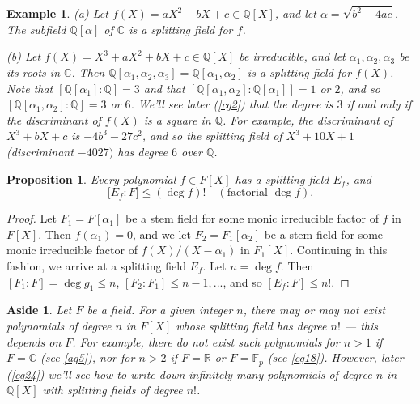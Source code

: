 \documentclass[a4paper,11pt,final,openany]{memoir}
\newtheorem{proposition}[X]{Proposition}
\newtheorem{example}[X]{Example}
\newtheorem{aside}[X]{Aside}
\theoremstyle{nonumberplain}
\newtheorem{proof}{Proof.}
\begin{document}
\begin{example}
\label{sf3}(a) Let $f(X)=aX^{2}+bX+c\in\mathbb{Q}{}[X]$, and let $\alpha
=\sqrt{b^{2}-4ac}$. The subfield $\mathbb{Q}[\alpha]$ of $\mathbb{C}$ is a
splitting field for $f$.

(b) Let $f(X)=X^{3}+aX^{2}+bX+c\in\mathbb{Q}[X]$ be irreducible, and let
$\alpha_{1},\alpha_{2},\alpha_{3}$ be its roots in $\mathbb{C}$. Then
$\mathbb{Q}[\alpha_{1},\alpha_{2},\alpha_{3}]=\mathbb{Q}[\alpha_{1},\alpha
_{2}]$ is a splitting field for $f(X)$. Note that $[\mathbb{Q}[\alpha
_{1}]\colon\mathbb{Q}]=3$ and that $[\mathbb{Q}[\alpha_{1},\alpha_{2}%
]\colon\mathbb{Q}[\alpha_{1}]]=1$ or $2$, and so $[\mathbb{Q}[\alpha
_{1},\alpha_{2}]\colon\mathbb{Q}]=3$ or $6$. We'll see later (\ref{cg2}) that
the degree is $3$ if and only if the discriminant of $f(X)$ is a square in
$\mathbb{Q}{}$. For example, the discriminant of $X^{3}+bX+c$ is
$-4b^{3}-27c^{2}$, and so the splitting field of $X^{3}+10X+1$ (discriminant
$-4027)$ has degree $6$ over $\mathbb{Q}$.
\end{example}

\begin{proposition}
\label{sf4}Every polynomial $f\in F[X]$ has a splitting field $E_{f}$, and
\[
\lbrack E_{f}\colon F]\leq(\deg f)!\quad(\text{factorial }\deg f).
\]

\end{proposition}

\begin{proof}
Let $F_{1}=F[\alpha_{1}]$ be a stem field for some monic irreducible factor of
$f$ in $F[X]$. Then $f(\alpha_{1})=0$, and we let $F_{2}=F_{1}[\alpha_{2}]$ be
a stem field for some monic irreducible factor of $f(X)/(X-\alpha_{1})$ in
$F_{1}[X]$. Continuing in this fashion, we arrive at a splitting field $E_{f}%
$. Let $n=\deg f$. Then $[F_{1}\colon F]=\deg g_{1}\leq n$, $[F_{2}\colon
F_{1}]\leq n-1,...$, and so $[E_{f}\colon F]\leq n!$.
\end{proof}

\begin{aside}
\label{sf5}Let $F$ be a field. For a given integer $n$, there may or may not
exist polynomials of degree $n$ in $F[X]$ whose splitting field has degree
$n!$ --- this depends on $F$. For example, there do not exist such polynomials
for $n>1$ if $F=\mathbb{C}$ (see \ref{ag5}), nor for $n>2$ if $F=\mathbb{R}$
or $F=\mathbb{F}_{p}$ (see \ref{cg18}). However, later (\ref{cg24}) we'll see
how to write down infinitely many polynomials of degree $n$ in $\mathbb{Q}[X]$
with splitting fields of degree $n!$.
\end{aside}
\end{document}
